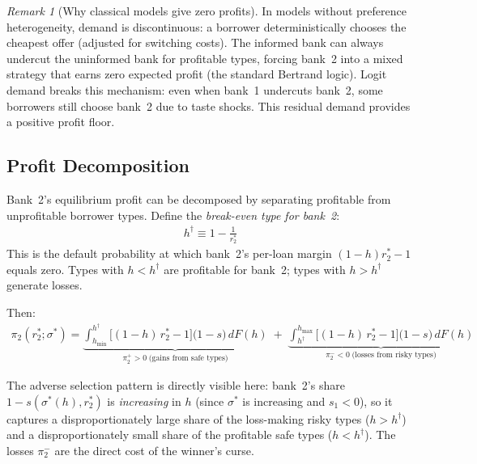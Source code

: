 \documentclass[12pt]{article}
\theoremstyle{plain}
\theoremstyle{plain}
\theoremstyle{definition}  %
\theoremstyle{remark}  %
\newtheorem{remark}[thm]{Remark}  %
\begin{document}
\begin{remark}[Why classical models give zero profits]
In models without preference heterogeneity, demand is discontinuous: a borrower deterministically chooses the cheapest offer (adjusted for switching costs). The informed bank can always undercut the uninformed bank for profitable types, forcing bank~2 into a mixed strategy that earns zero expected profit (the standard Bertrand logic). Logit demand breaks this mechanism: even when bank~1 undercuts bank~2, some borrowers still choose bank~2 due to taste shocks. This residual demand provides a positive profit floor.
\end{remark}

\subsection{Profit Decomposition}

Bank~2's equilibrium profit can be decomposed by separating profitable from unprofitable borrower types. Define the \emph{break-even type for bank~2}:
\begin{align}\label{eq:hdagger}
    h^\dagger \equiv 1 - \frac{1}{r_2^*}
\end{align}
This is the default probability at which bank~2's per-loan margin $(1-h)r_2^* - 1$ equals zero. Types with $h < h^\dagger$ are profitable for bank~2; types with $h > h^\dagger$ generate losses.

\medskip\noindent
Then:
\begin{align}\label{eq:pi2_decomp}
    \pi_2(r_2^*; \sigma^*) = \underbrace{\int_{h_{\min}}^{h^\dagger} \big[(1-h)\,r_2^* - 1\big]\big(1-s\big)\, dF(h)}_{\displaystyle\pi_2^+ > 0 \;\text{(gains from safe types)}} \;+\; \underbrace{\int_{h^\dagger}^{h_{\max}} \big[(1-h)\,r_2^* - 1\big]\big(1-s\big)\, dF(h)}_{\displaystyle\pi_2^- < 0 \;\text{(losses from risky types)}}
\end{align}

The adverse selection pattern is directly visible here: bank~2's share $1-s(\sigma^*(h), r_2^*)$ is \emph{increasing} in $h$ (since $\sigma^*$ is increasing and $s_1 < 0$), so it captures a disproportionately large share of the loss-making risky types ($h > h^\dagger$) and a disproportionately small share of the profitable safe types ($h < h^\dagger$). The losses $\pi_2^-$ are the direct cost of the winner's curse.
\end{document}
